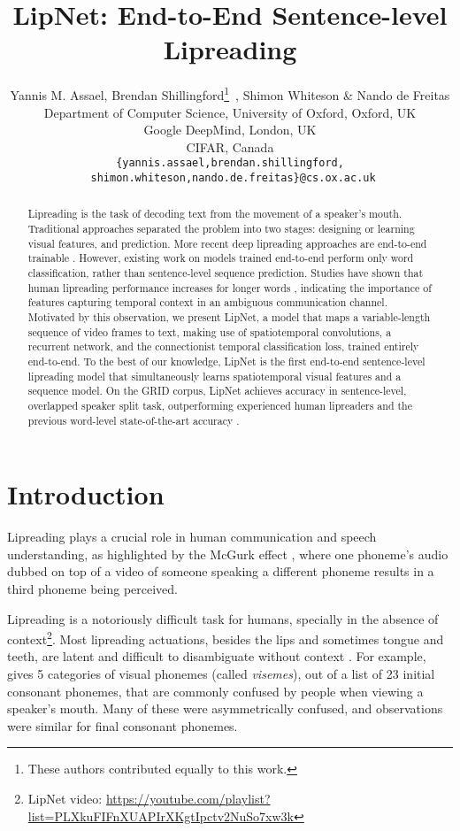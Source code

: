 \documentclass{article}
\title{LipNet: \hspace{-.5mm}End-\hspace{-.5mm}to-End \hspace{-.5mm}Sentence-level \hspace{-.5mm}Lipreading}
\author{Yannis M. Assael, Brendan Shillingford\thanks{These authors contributed equally to this work.}\ , Shimon Whiteson \& Nando de Freitas\\
Department of Computer Science, University of Oxford, Oxford, UK \\
Google DeepMind, London, UK \\
CIFAR, Canada \\
\texttt{\{yannis.assael,brendan.shillingford,}\\\texttt{\ shimon.whiteson,nando.de.freitas\}@cs.ox.ac.uk}
}
\begin{document}
\maketitle
\begin{abstract}
	Lipreading is the task of decoding text from the movement of a speaker's mouth. 
Traditional approaches separated the problem into two stages: designing or learning visual features, and prediction. More recent deep lipreading approaches are end-to-end trainable \citep{wand2016lipreading,chung2016lip}.  
However, existing work on models trained end-to-end perform only word classification, rather than sentence-level sequence prediction.
Studies have shown that human lipreading performance increases for longer words \citep{easton1982perceptual}, indicating the importance of features capturing temporal context in an ambiguous communication channel. Motivated by this observation, we present LipNet, a model that maps a variable-length sequence of video frames to text, making use of spatiotemporal convolutions, a recurrent network, and the connectionist temporal classification loss, trained entirely end-to-end.
To the best of our knowledge, LipNet is the first end-to-end sentence-level lipreading model that simultaneously learns spatiotemporal visual features and a sequence model. On the GRID corpus, LipNet achieves  accuracy in sentence-level, overlapped speaker split task, outperforming experienced human lipreaders and the previous  word-level state-of-the-art accuracy \citep{gergen2016dynamic}.
 \end{abstract}

\section{Introduction}
Lipreading plays a crucial role in human communication and speech understanding, as highlighted by the McGurk effect \citep{1976Nature}, where one phoneme's audio dubbed on top of a video of someone speaking a different phoneme results in a third phoneme being perceived.

Lipreading is a notoriously difficult task for humans, specially in the absence of context\footnote{LipNet video: 
{\fontsize{8}{8}\selectfont \url{https://youtube.com/playlist?list=PLXkuFIFnXUAPIrXKgtIpctv2NuSo7xw3k}}}.  
Most lipreading actuations, besides the lips and sometimes tongue and teeth, are latent and difficult to disambiguate without context \citep{fisher1968confusions,woodward1960phoneme}. For example, \citet{fisher1968confusions} gives 5 categories of visual phonemes (called \textit{visemes}), out of a list of 23 initial consonant phonemes, that are commonly confused by people when viewing a speaker's mouth. Many of these were asymmetrically confused, and observations were similar for final consonant phonemes.
\end{document}
